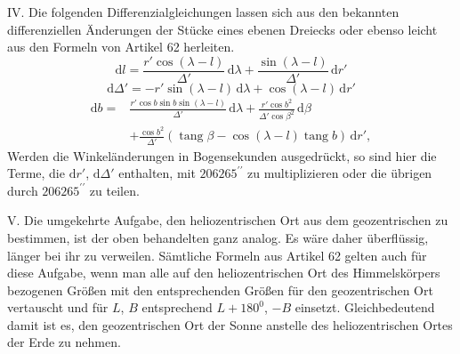 IV. Die folgenden Differenzialgleichungen lassen sich aus den bekannten differenziellen Änderungen der Stücke eines ebenen Dreiecks oder ebenso leicht aus den Formeln von Artikel 62 herleiten.
\[
\mathrm{d}l=\frac{r'\cos(\lambda-l)}{\Delta'}\,\mathrm{d}\lambda+\frac{\sin(\lambda-l)}{\Delta'}\,\mathrm{d}r'
\]
\[
\mathrm{d}\Delta'=-r'\sin(\lambda-l)\,\mathrm{d}\lambda+\cos(\lambda-l)\,\mathrm{d}r'
\]
\[
\begin{aligned}
\mathrm{d}b={}&\frac{r'\cos b\sin b\sin(\lambda-l)}{\Delta'}\,\mathrm{d}\lambda
+\frac{r'\cos b^2}{\Delta'\cos\beta^2}\,\mathrm{d}\beta\\
&+\frac{\cos b^2}{\Delta'}(\operatorname{tang}\beta-\cos(\lambda-l)\operatorname{tang}b)\,\mathrm{d}r',
\end{aligned}
\]
\noindent Werden die Winkeländerungen in Bogensekunden ausgedrückt, so sind hier die Terme, die $\mathrm{d}r'$, $\mathrm{d}\Delta'$ enthalten, mit $206265^{\prime\prime}$ zu multiplizieren oder die übrigen durch $206265^{\prime\prime}$ zu teilen.

V. Die umgekehrte Aufgabe, den heliozentrischen Ort aus dem geozentrischen zu bestimmen, ist der oben behandelten ganz analog. Es wäre daher überflüssig, länger bei ihr zu verweilen. Sämtliche Formeln aus Artikel 62 gelten auch für diese Aufgabe, wenn man alle auf den heliozentrischen Ort des Himmelskörpers bezogenen Größen mit den entsprechenden Größen für den geozentrischen Ort vertauscht und für $L$, $B$ entsprechend $L+180^0$, $-B$ einsetzt. Gleichbedeutend damit ist es, den geozentrischen Ort der Sonne anstelle des heliozentrischen Ortes der Erde zu nehmen.
